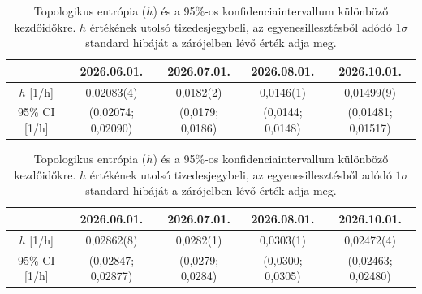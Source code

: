 \documentclass[12pt,a4paper]{article}
\begin{document}
\begin{table}[H]
    \centering
    \begin{subtable}{\textwidth}
        \centering
        \begin{tabular}{|c|c|c|c|c|}\hline
            & \textbf{2026.06.01.} & \textbf{2026.07.01.} & \textbf{2026.08.01.} & \textbf{2026.10.01.} \\\hline
            $h$ [1/h] & 0,02083(4) & 0,0182(2) & 0,0146(1) & 0,01499(9) \\\hline
            95\% CI [1/h] & (0,02074; 0,02090) & (0,0179; 0,0186) & (0,0144; 0,0148) & (0,01481; 0,01517) \\\hline
        \end{tabular}
        \caption{AIFS}
    \end{subtable}

    \vspace{0.6cm}

    \begin{subtable}{\textwidth}
        \centering
        \begin{tabular}{|c|c|c|c|c|}\hline
            & \textbf{2026.06.01.} & \textbf{2026.07.01.} & \textbf{2026.08.01.} & \textbf{2026.10.01.} \\\hline
            $h$ [1/h] & 0,02862(8) & 0,0282(1) & 0,0303(1) & 0,02472(4) \\\hline
            95\% CI [1/h] & (0,02847; 0,02877) & (0,0279; 0,0284) & (0,0300; 0,0305) & (0,02463; 0,02480) \\\hline
        \end{tabular}
        \caption{IFS}
    \end{subtable}
    \caption{Topologikus entrópia ($h$) és a 95\%-os konfidenciaintervallum különböző kezdőidőkre. $h$ értékének utolsó tizedesjegybeli, az egyenesillesztésből adódó $1 \sigma$ standard hibáját a zárójelben lévő érték adja meg.}
    \label{tab:hun500_top}
\end{table}
\end{document}
